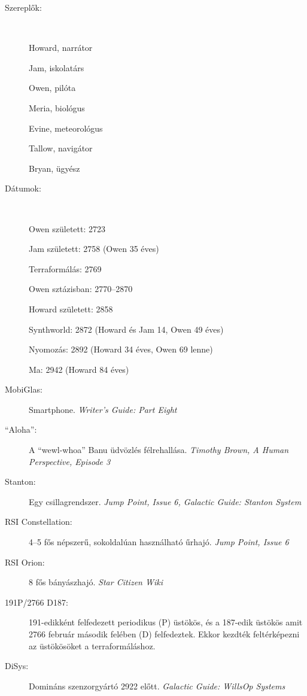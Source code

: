 \documentclass[10pt]{memoir}
\begin{document}
\begin{description}

\item[Szereplők:] ~ \par
Howard, narrátor \par
Jam, iskolatárs \par
Owen, pilóta \par
Meria, biológus \par
Evine, meteorológus \par
Tallow, navigátor \par
Bryan, ügyész \par

\item[Dátumok:] ~ \par
Owen született: 2723 \par
Jam született: 2758 (Owen 35 éves) \par
Terraformálás: 2769 \par
Owen sztázisban: 2770--2870 \par
Howard született: 2858 \par
Synthworld: 2872 (Howard és Jam 14, Owen 49 éves) \par
Nyomozás: 2892 (Howard 34 éves, Owen 69 lenne) \par
Ma: 2942 (Howard 84 éves) \par

\item[MobiGlas:] Smartphone. \textit{Writer's Guide: Part Eight}

\item[``Aloha'':] A ``wewl-whoa'' Banu üdvözlés félrehallása. \textit{Timothy
Brown, A Human Perspective, Episode 3}

\item[Stanton:] Egy csillagrendszer. \textit{Jump Point, Issue 6, Galactic
Guide: Stanton System}

\item[RSI Constellation:] 4--5 fős népszerű, sokoldalúan használható űrhajó.
\textit{Jump Point, Issue 6}

\item[RSI Orion:] 8 fős bányászhajó. \textit{Star Citizen Wiki}

\item[191P/2766 D187:] 191-edikként felfedezett periodikus (P) üstökös, és a
187-edik üstökös amit 2766 február második felében (D) felfedeztek. Ekkor
kezdték feltérképezni az üstökösöket a terraformáláshoz.

\item[DiSys:] Domináns szenzorgyártó 2922 előtt. \textit{Galactic Guide:
WillsOp Systems}


\end{description}
\end{document}
